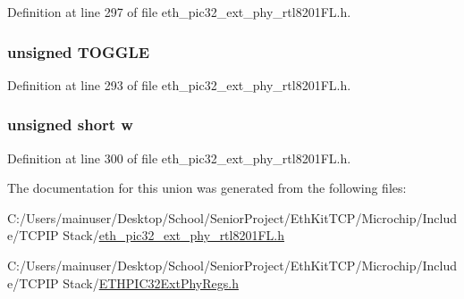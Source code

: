 Definition at line 297 of file eth\+\_\+pic32\+\_\+ext\+\_\+phy\+\_\+rtl8201\+F\+L.\+h.

\hypertarget{union_____a_n_l_p_r_n_pbits__t_ab4110904eded0b4b6a2280a6b4b9f4c2}{}
\subsubsection[{T\+O\+G\+G\+L\+E}]{\setlength{\rightskip}{0pt plus 5cm}unsigned T\+O\+G\+G\+L\+E}\label{union_____a_n_l_p_r_n_pbits__t_ab4110904eded0b4b6a2280a6b4b9f4c2}


Definition at line 293 of file eth\+\_\+pic32\+\_\+ext\+\_\+phy\+\_\+rtl8201\+F\+L.\+h.

\hypertarget{union_____a_n_l_p_r_n_pbits__t_a160850a4684a3e82c2323033964f2e98}{}
\subsubsection[{w}]{\setlength{\rightskip}{0pt plus 5cm}unsigned short w}\label{union_____a_n_l_p_r_n_pbits__t_a160850a4684a3e82c2323033964f2e98}


Definition at line 300 of file eth\+\_\+pic32\+\_\+ext\+\_\+phy\+\_\+rtl8201\+F\+L.\+h.



The documentation for this union was generated from the following files\+:\begin{DoxyCompactItemize}
\item 
C\+:/\+Users/mainuser/\+Desktop/\+School/\+Senior\+Project/\+Eth\+Kit\+T\+C\+P/\+Microchip/\+Include/\+T\+C\+P\+I\+P Stack/\hyperlink{eth__pic32__ext__phy__rtl8201_f_l_8h}{eth\+\_\+pic32\+\_\+ext\+\_\+phy\+\_\+rtl8201\+F\+L.\+h}\item 
C\+:/\+Users/mainuser/\+Desktop/\+School/\+Senior\+Project/\+Eth\+Kit\+T\+C\+P/\+Microchip/\+Include/\+T\+C\+P\+I\+P Stack/\hyperlink{_e_t_h_p_i_c32_ext_phy_regs_8h}{E\+T\+H\+P\+I\+C32\+Ext\+Phy\+Regs.\+h}\end{DoxyCompactItemize}
